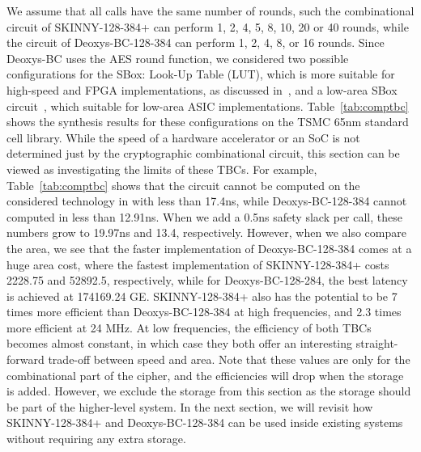 \documentclass[conference]{IEEEtran}
\begin{document}
We assume that all calls have the same number of rounds, such the combinational circuit of SKINNY-128-384+ can perform 1, 2, 4, 5, 8, 10, 20 or 40 rounds, while the circuit of Deoxys-BC-128-384 can perform 1, 2, 4, 8, or 16 rounds. Since Deoxys-BC uses the AES round function, we considered two possible configurations for the SBox: Look-Up Table (LUT), which is more suitable for high-speed and FPGA implementations, as discussed in~\cite{khairallah2017looting}, and a low-area SBox circuit~\cite{boyarperlata,tinyaes}, which suitable for low-area ASIC implementations. Table~\ref{tab:comptbc} shows the synthesis results for these configurations on the TSMC 65nm standard cell library. While the speed of a hardware accelerator or an SoC is not determined just by the cryptographic combinational circuit, this section can be viewed as investigating the limits of these TBCs. For example, Table~\ref{tab:comptbc} shows that the circuit cannot be computed on the considered technology in with less than 17.4ns, while Deoxys-BC-128-384 cannot computed in less than 12.91ns. When we add a 0.5ns safety slack per call, these numbers grow to 19.97ns and 13.4, respectively. However, when we also compare the area, we see that the faster implementation of Deoxys-BC-128-384 comes at a huge area cost, where the fastest implementation of SKINNY-128-384+ costs 2228.75 and 52892.5, respectively, while for Deoxys-BC-128-284, the best latency is achieved at 174169.24 GE. SKINNY-128-384+ also has the potential to be 7 times more efficient than Deoxys-BC-128-384 at high frequencies, and 2.3 times more efficient at 24 MHz. At low frequencies, the efficiency of both TBCs becomes almost constant, in which case they both offer an interesting straight-forward trade-off between speed and area. Note that these values are only for the combinational part of the cipher, and the efficiencies will drop when the storage is added. However, we exclude the storage from this section as the storage should be part of the higher-level system. In the next section, we will revisit how SKINNY-128-384+ and Deoxys-BC-128-384 can be used inside existing systems without requiring any extra storage.
\end{document}
